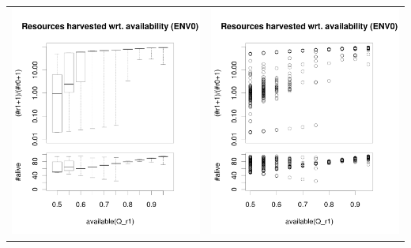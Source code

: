 \documentclass[a4paper,10pt]{article}
\begin{document}
\begin{table}[h!]
\begin{tabular}{cc}
 \newline
 \includegraphics[width=\imgSize]{images/5StaticEnv/ratioAndRep_staticEnv0LogY}& \includegraphics[width=\imgSize]{images/5StaticEnv/ratioAndRep_staticEnvPlot0LogY}\\

\end{tabular}
\end{table}
\end{document}

